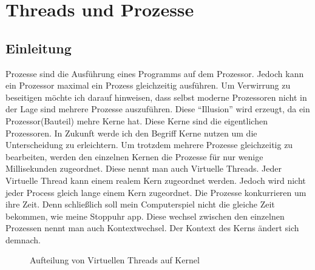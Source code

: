 \section{Threads und Prozesse}

\subsection{Einleitung}
Prozesse sind die Ausführung eines Programms auf dem Prozessor. Jedoch kann ein Prozessor maximal ein Prozess gleichzeitig ausführen. Um Verwirrung zu beseitigen möchte ich darauf hinweisen, dass selbst moderne Prozessoren nicht in der Lage sind mehrere Prozesse auszuführen. Diese ``Illusion'' wird erzeugt, da ein Prozessor(Bauteil) mehre Kerne hat. Diese Kerne sind die eigentlichen Prozessoren. In Zukunft werde ich den Begriff Kerne nutzen um die Unterscheidung zu erleichtern. Um trotzdem mehrere Prozesse gleichzeitig zu bearbeiten, werden den einzelnen Kernen die Prozesse für nur wenige Millisekunden zugeordnet. Diese nennt man auch Virtuelle Threads. Jeder Virtuelle Thread kann einem realem Kern zugeordnet werden. Jedoch wird nicht jeder Process gleich lange einem Kern zugeordnet. Die Prozesse konkurrieren um ihre Zeit. Denn schließlich soll mein Computerspiel nicht die gleiche Zeit bekommen, wie meine Stoppuhr app. Diese wechsel zwischen den einzelnen Prozessen nennt man auch Kontextwechsel. Der Kontext des Kerns ändert sich demnach.

\begin{figure}[h]
    \centering
    \caption{Aufteilung von Virtuellen Threads auf Kernel}
\end{figure}

